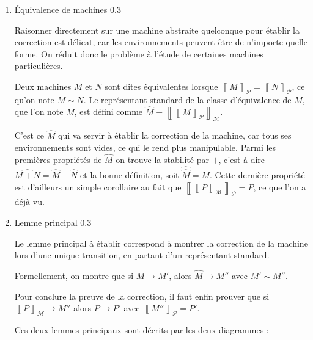 \documentclass[11pt]{article}
\newcommand{\machine}[1]{\left\llbracket{#1}\right\rrbracket_{\mathcal{M}}}
\newcommand{\process}[1]{\left\llbracket{#1}\right\rrbracket_{\mathcal{P}}}
\newcounter{c_theo}
\newcounter{c_def}
\begin{document}
\begin{enumerate}
\item Équivalence de machines 0.3
\label{sec-3-2-3-2}

Raisonner directement sur une machine abstraite quelconque pour établir la correction est délicat, car les environnements peuvent être de n'importe quelle forme.
On réduit donc le problème à l'étude de certaines machines particulières.

Deux machines $M$ et $N$ sont dites équivalentes lorsque $\process{M} = \process{N}$, ce qu'on note $M\sim N$.
Le représentant standard de la classe d'équivalence de $M$, que l'on note $\widehat{M}$, est défini comme $\widehat{M} = \machine{\process{M}}$.

C'est ce $\widehat{M}$ qui va servir à établir la correction de la machine, car tous ses environnements sont vides, ce qui le rend plus manipulable.
Parmi les premières propriétés de $\widehat{M}$ on trouve la stabilité par $+$, c'est-à-dire $\widehat{M+N} = \widehat{M} + \widehat{N}$ et la bonne définition, soit $\widehat{\widehat{M}} = M$.
Cette dernière propriété est d'ailleurs un simple corollaire au fait que $\process{\machine{P}} = P$, ce que l'on a déjà vu.

\item Lemme principal 0.3
\label{sec-3-2-3-3}

Le lemme principal à établir correspond à montrer la correction de la machine lors d'une unique transition, en partant d'un représentant standard.

Formellement, on montre que si $M\to M'$, alors $\widehat{M}\to M''$ avec $M'\sim M''$.

Pour conclure la preuve de la correction, il faut enfin prouver que si $\machine{P}\to M''$ alors $P\to P'$ avec $\process{M''} = P'$.

Ces deux lemmes principaux sont décrits par les deux diagrammes :\\

\end{enumerate}
\end{document}
